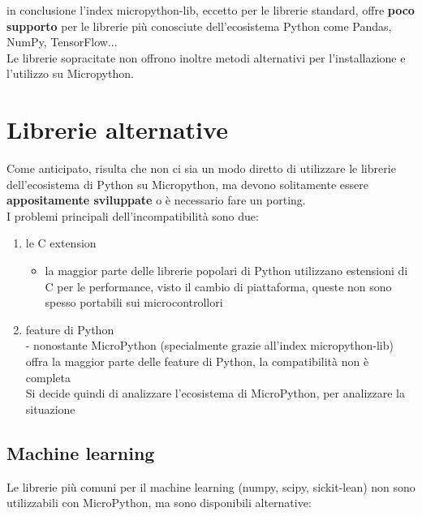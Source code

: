\documentclass[12pt,a4paper]{report}
\begin{document}
in conclusione l'index micropython-lib, eccetto per le
librerie standard, offre \textbf{poco supporto} per le librerie più
conosciute dell'ecosistema Python come Pandas, NumPy,
TensorFlow...\\
Le librerie sopracitate non offrono inoltre metodi alternativi per
l'installazione e l'utilizzo su
Micropython.

\section{Librerie alternative}

Come anticipato, risulta che non ci sia un modo diretto di utilizzare
le librerie dell'ecosistema di Python su Micropython, ma
devono solitamente essere \textbf{appositamente sviluppate} o è
necessario fare un porting.\\
I problemi principali dell'incompatibilità sono due:

\begin{enumerate}
\item
  le C extension

  \begin{itemize}
    \item
    la maggior parte delle librerie popolari di Python utilizzano
    estensioni di C per le performance, visto il cambio di piattaforma,
    queste non sono spesso portabili sui microcontrollori
  \end{itemize}
\item
  feature di Python\\
  - nonostante MicroPython (specialmente grazie
  all'index micropython-lib) offra la maggior parte
  delle feature di Python, la compatibilità non è completa\\
  Si decide quindi di analizzare l'ecosistema di
  MicroPython, per analizzare la situazione
\end{enumerate}

\subsection{Machine learning}\label{machine-learning}

Le librerie più comuni per il machine learning (numpy, scipy,
sickit-lean) non sono utilizzabili con MicroPython, ma sono disponibili
alternative:
\end{document}

